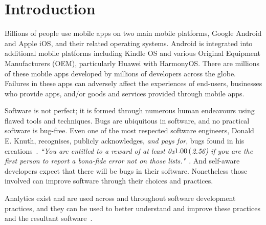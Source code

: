 \chapter{Introduction}
\label{the-introduction}

Billions of people use mobile apps on two main mobile platforms, Google Android and Apple iOS, and their related operating systems.  Android is integrated into additional mobile platforms including Kindle OS and various Original Equipment Manufacturers (OEM), particularly Huawei with HarmonyOS. There are millions of these mobile apps developed by millions of developers across the globe. Failures in these apps can adversely affect the experiences of end-users, businesses who provide apps, and/or goods and services provided through mobile apps. 

Software is not perfect; it is formed through numerous human endeavours using flawed tools and techniques. 
Bugs are ubiquitous in software, and no practical software is bug-free. Even one of the most respected software engineers, Donald E. Knuth, recognises, publicly acknowledges, \emph{and pays for}, bugs found in his creations~\citep{knuth_trutex, wikipedia__knuth_reward_checks_2020}. \emph{``You are entitled to a reward of at least 0x$1.00 \nobreak\hspace{.16667em plus .08333em} ($2.56) if you are the first person to report a bona-fide error not on those lists."}~\citep{knuth_the_bank_of_san_serriffe}. And self-aware developers expect that there will be bugs in their software. Nonetheless those involved can improve software through their choices and practices.

Analytics exist and are used across and throughout software development practices, and they can be used to better understand and improve these practices and the resultant software~\citep{buse_analytics_2010, buse2012_information_needs_for_software_development_analytics}.

